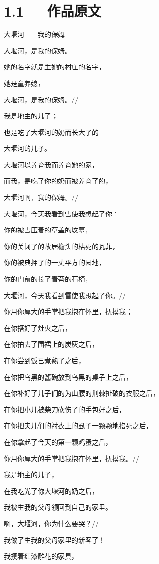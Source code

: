 \documentclass[letterpaper,12pt,english]{sphinxmanual}
\begin{document}
\section{1.1   作品原文}
\label{\detokenize{p01_u6563_u6587/_u827e_u9752-_u5927_u5830_u6cb3_u2014_u2014_u6211_u7684_u4fdd_u59c6:id3}}
大堰河——我的保姆

大堰河，是我的保姆。

她的名字就是生她的村庄的名字，

她是童养媳，

大堰河，是我的保姆。//

我是地主的儿子；

也是吃了大堰河的奶而长大了的

大堰河的儿子。

大堰河以养育我而养育她的家，

而我，是吃了你的奶而被养育了的，

大堰河啊，我的保姆。//

大堰河，今天我看到雪使我想起了你：

你的被雪压着的草盖的坟墓，

你的关闭了的故居檐头的枯死的瓦菲，

你的被典押了的一丈平方的园地，

你的门前的长了青苔的石椅，

大堰河，今天我看到雪使我想起了你。//

你用你厚大的手掌把我抱在怀里，抚摸我；

在你搭好了灶火之后，

在你拍去了围裙上的炭灰之后，

在你尝到饭已煮熟了之后，

在你把乌黑的酱碗放到乌黑的桌子上之后，

在你补好了儿子们的为山腰的荆棘扯破的衣服之后，

在你把小儿被柴刀砍伤了的手包好之后，

在你把夫儿们的衬衣上的虱子一颗颗地掐死之后，

在你拿起了今天的第一颗鸡蛋之后，

你用你厚大的手掌把我抱在怀里，抚摸我。//

我是地主的儿子，

在我吃光了你大堰河的奶之后，

我被生我的父母领回到自己的家里。

啊，大堰河，你为什么要哭？//

我做了生我的父母家里的新客了！

我摸着红漆雕花的家具，
\end{document}
